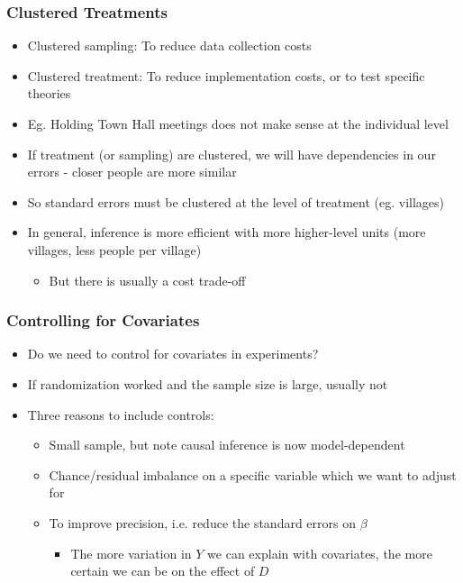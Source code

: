 \documentclass[xcolor=x11names,compress]{beamer}\usepackage[]{graphicx}\usepackage[]{color}
\renewcommand{\(}{\begin{columns}}
\renewcommand{\)}{\end{columns}}
\newcommand{\<}[1]{\begin{column}{#1}}
\renewcommand{\>}{\end{column}}
\begin{document}
\begin{frame}
\frametitle{Clustered Treatments}
\begin{itemize}
\item Clustered sampling: To reduce data collection costs
\pause
\item Clustered treatment: To reduce implementation costs, or to test specific theories
\pause
\item Eg. Holding Town Hall meetings does not make sense at the individual level
\pause
\item If treatment (or sampling) are clustered, we will have dependencies in our errors - closer people are more similar
\pause
\item So standard errors must be clustered at the level of treatment (eg. villages)
\pause
\item In general, inference is more efficient with more higher-level units (more villages, less people per village)
\pause
\begin{itemize}
\item But there is usually a cost trade-off
\end{itemize}
\end{itemize}
\end{frame}

\begin{frame}
\frametitle{Controlling for Covariates}
\begin{itemize}
\item Do we need to control for covariates in experiments?
\pause
\item If randomization worked and the sample size is large, usually not
\pause
\item Three reasons to include controls:
\begin{itemize}
\item Small sample, but note causal inference is now model-dependent
\pause
\item Chance/residual imbalance on a specific variable which we want to adjust for
\pause
\item To improve precision, i.e. reduce the standard errors on $\beta$
\begin{itemize}
\item The more variation in $Y$ we can explain with covariates, the more certain we can be on the effect of $D$
\end{itemize}
\end{itemize}
\end{itemize}
\end{frame}
\end{document}
